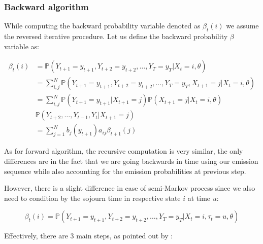 \subsubsection*{Backward algorithm}

While computing the backward probability variable denoted as $\beta_t(i)$ we assume the reversed iterative procedure. 
Let us define the backward probability $\beta$ variable as:

\begin{align} \label{eq: backward}
\beta_t(i)  &= \mathbb{P}(Y_{t+1} = y_{t+1}, Y_{t+2} = y_{t+2},\ldots, Y_T = y_T| X_t = i, \theta) \\ \nonumber
            &= \sum_{i,j}^N \mathbb{P}(Y_{t+1} = y_{t+1}, Y_{t+2} = y_{t+2},\ldots, Y_T = y_T,X_{t+1} = j | X_t = i, \theta)  \\ \nonumber
            &= \sum_{i,j}^N \mathbb{P}(Y_{t+1} = y_{t+1}| X_{t+1} = j) \mathbb{P}(X_{t+1} = j | X_t = i, \theta) \\ \nonumber
            & \mathbb{P}(Y_{t+2},\ldots,Y_{t-1},Y_t|X_{t+1}=j)  \\ \nonumber
            &= \sum_{j=1}^N b_j(y_{t+1})a_{ij} \beta_{t+1}(j)
\end{align}

As for forward algorithm, the recursive computation is very similar, the only differences are in the fact that we are going backwards in time using our emission sequence 
while also accounting for the emission probabilities at previous step. 

However, there is a slight difference in case of semi-Markov process since we also need to condition by the sojourn time in respective state $i$ at time $u$:

\begin{equation}
    \beta_t(i) = \mathbb{P}(Y_{t+1} = y_{t+1}, Y_{t+2} = y_{t+2},\ldots, Y_T = y_T| X_t = i, \tau_t = u, \theta)
\end{equation}

Effectively, there are 3 main steps, as pointed out by \citep{Oliver2013}:

